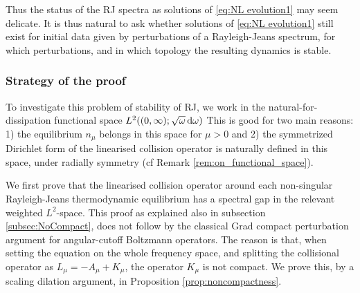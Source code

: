 \documentclass[reqno,11pt,letterpaper]{amsart}
\numberwithin{equation}{section}
\newcommand{\dd}{\, {\rm d}}
\begin{document}
Thus the status of the RJ spectra as solutions of \eqref{eq:NL evolution1} may seem delicate.  
It is thus natural to ask whether solutions of \eqref{eq:NL evolution1} still exist for initial data given by perturbations of a Rayleigh-Jeans spectrum, for which perturbations, and in which topology the resulting dynamics is stable.
\vspace{-0.10cm}

\subsubsection{Strategy of the proof}

To investigate this problem of stability of RJ, we work in the natural-for-dissipation functional space $L^2((0,\infty);\sqrt{\omega}\dd\omega)$ This is good for two main reasons: 1) the equilibrium $n_\mu$ belongs in this space for $\mu>0$ and 2)  
the symmetrized Dirichlet form
of the linearised collision operator is naturally defined in this space, under radially symmetry (cf Remark \ref{rem:on_functional_space}).

We first prove that the linearised collision operator around each non-singular Rayleigh-Jeans thermodynamic equilibrium has a spectral gap in the relevant
weighted $L^2$-space. This proof as explained also in subsection \ref{subsec:NoCompact}, does not follow by the classical Grad
compact perturbation argument for angular-cutoff Boltzmann
operators. The reason is that, when setting the equation on the whole frequency space, and splitting the collisional operator as  $L_\mu= -A_\mu + K_\mu$, the operator $K_\mu$ is not compact. We prove this, by a scaling dilation argument, in Proposition \ref{prop:noncompactness}.
\end{document}
